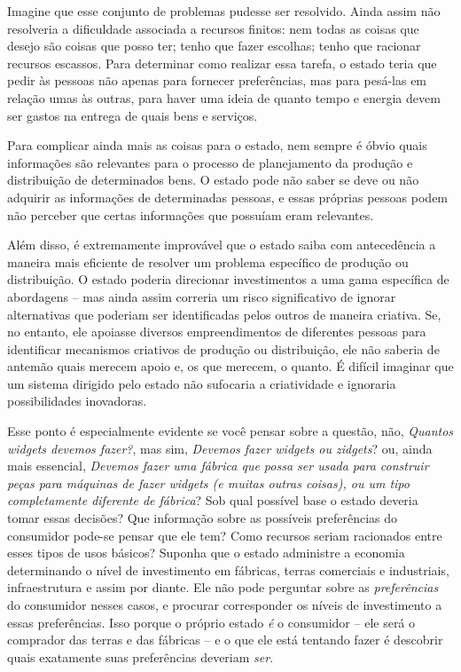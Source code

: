 Imagine que esse conjunto de problemas pudesse ser resolvido. Ainda assim não resolveria a dificuldade associada a recursos finitos: nem todas as coisas que desejo são coisas que posso ter; tenho que fazer escolhas; tenho que racionar recursos escassos. Para determinar como realizar essa tarefa, o estado teria que pedir às pessoas não apenas para fornecer preferências, mas para pesá-las em relação umas às outras, para haver uma ideia de quanto tempo e energia devem ser gastos na entrega de quais bens e serviços.

Para complicar ainda mais as coisas para o estado, nem sempre é óbvio quais informações são relevantes para o processo de planejamento da produção e distribuição de determinados bens. O estado pode não saber se deve ou não adquirir as informações de determinadas pessoas, e essas próprias pessoas podem não perceber que certas informações que possuíam eram relevantes.

Além disso, é extremamente improvável que o estado saiba com antecedência a maneira mais eficiente de resolver um problema específico de produção ou distribuição. O estado poderia direcionar investimentos a uma gama específica de abordagens -- mas ainda assim correria um risco significativo de ignorar alternativas que poderiam ser identificadas pelos outros de maneira criativa. Se, no entanto, ele apoiasse diversos empreendimentos de diferentes pessoas para identificar mecanismos criativos de produção ou distribuição, ele não saberia de antemão quais merecem apoio e, os que merecem, o quanto. É difícil imaginar que um sistema dirigido pelo estado não sufocaria a criatividade e ignoraria possibilidades inovadoras. 

Esse ponto é especialmente evidente se você pensar sobre a questão, não, \emph{Quantos widgets devemos fazer?}, mas sim, \emph{Devemos fazer widgets ou zidgets}? ou, ainda mais essencial, \emph{Devemos fazer uma fábrica que possa ser usada para construir peças para máquinas de fazer widgets (e muitas outras coisas), ou um tipo completamente diferente de fábrica}? Sob qual possível base o estado deveria tomar essas decisões? Que informação sobre as possíveis preferências do consumidor pode-se pensar que ele tem? Como recursos seriam racionados entre esses tipos de usos básicos? Suponha que o estado administre a economia determinando o nível de investimento em fábricas, terras comerciais e industriais, infraestrutura e assim por diante. Ele não pode perguntar sobre as \emph{preferências} do consumidor nesses casos, e procurar corresponder os níveis de investimento a essas preferências. Isso porque o próprio estado \emph{é} o consumidor -- ele será o comprador das terras e das fábricas -- e o que ele está tentando fazer é descobrir quais exatamente suas preferências deveriam \emph{ser}.

